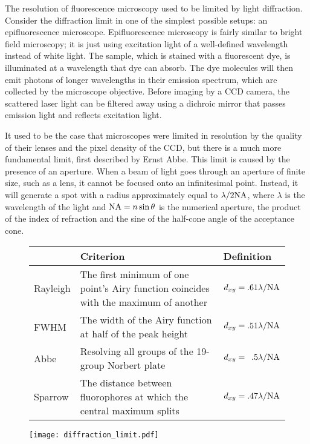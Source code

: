 The resolution of fluorescence microscopy used to be limited by light diffraction. Consider the diffraction limit in one of the simplest possible setups: an epifluorescence microscope. Epifluorescence microscopy is fairly similar to bright field microscopy; it is just using excitation light of a well-defined wavelength instead of white light. The sample, which is stained with a fluorescent dye, is illuminated at a wavelength that dye can absorb. The dye molecules will then emit photons of longer wavelengths in their emission spectrum, which are collected by the microscope objective. Before imaging by a CCD camera, the scattered laser light can be filtered away using a dichroic mirror that passes emission light and reflects excitation light. 


It used to be the case that microscopes were limited in resolution by the quality of their lenses and the pixel density of the CCD, but there is a much more fundamental limit, first described by Ernst Abbe. This limit is caused by the presence of an aperture. When a beam of light goes through an aperture of finite size, such as a lens, it cannot be focused onto an infinitesimal point. Instead, it will generate a spot with a radius approximately equal to $ \lambda/2\mathrm{NA} $, where $ \lambda $ is the wavelength of the light and $ \mathrm{NA}= n\sin\theta $ is the numerical aperture, the product of the index of refraction and the sine of the half-cone angle of the acceptance cone.

\begin{figure}[!t]
	\centering
	\begin{tabularx}{\linewidth}{lXl}
		\toprule
		& Criterion                                                                            & Definition                            \\ \midrule
		Rayleigh & The first minimum of one point's Airy function coincides with the maximum of another & $ d_{xy} = .61\lambda/\mathrm{NA} $           \\
		FWHM     & The width of the Airy function at half of the peak height                            & $ d_{xy} = .51\lambda/\mathrm{NA} $           \\
		Abbe     & Resolving all groups of the 19-group Norbert plate \cite{Abbe1873, Norbert}                                  & $ d_{xy} = \phantom{1}.5\lambda/\mathrm{NA} $ \\
		Sparrow  & The distance between fluorophores at which the central maximum splits                & $ d_{xy} = .47 \lambda/\mathrm{NA} $          \\ \bottomrule
	\end{tabularx}
	\label{tab:resolution limits}
	
	\centering
	\texttt{[image: diffraction\_limit.pdf]}
	\label{fig:diffraction limit}
\end{figure}

